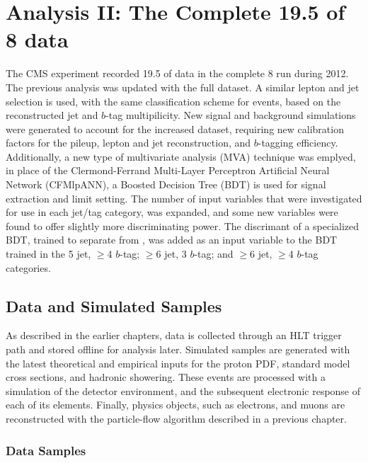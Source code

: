 \chapter{Analysis II: The Complete 19.5 \fbinv of 8 \TeV data}
\label{analysis_II_overview}

\par The CMS experiment recorded 19.5 \fbinv of data in the complete 8
\TeV run during 2012.  The previous analysis was updated with the full
dataset.  A similar lepton and jet selection is used, with the same
classification scheme for events, based on the reconstructed jet and
$b$-tag multipilicity.  New signal and background simulations were
generated to account for the increased dataset, requiring new
calibration factors for the pileup, lepton and jet reconstruction, and
$b$-tagging efficiency.  Additionally, a new type of multivariate
analysis (MVA) technique was emplyed, in place of the Clermond-Ferrand
Multi-Layer Perceptron Artificial Neural Network (CFMlpANN), a Boosted
Decision Tree (BDT) is used for signal extraction and limit setting.
The number of input variables that were investigated for use in each
jet/tag category, was expanded, and some new variables were found to
offer slightly more discriminating power.  The discrimant of a
specialized BDT, trained to separate \ttbb from \ttH, was added as an
input variable to the BDT trained in the 5 jet, $\ge$4 $b$-tag; $\ge$6
jet, 3 $b$-tag; and $\ge$6 jet, $\ge$4 $b$-tag categories.  

\section{Data and Simulated Samples}
\label{data_and_mc_II_overview}

\par As described in the earlier chapters, data is collected through
an HLT trigger path and stored offline for analysis later.  Simulated
samples are generated with the latest theoretical and empirical inputs
for the proton PDF, standard model cross sections, and hadronic
showering.  These events are processed with a simulation of the
detector environment, and the subsequent electronic response of each
of its elements.  Finally, physics objects, such as electrons, and
muons are reconstructed with the particle-flow algorithm described in
a previous chapter.  


\subsection{Data Samples}
\label{data_II_overview}

